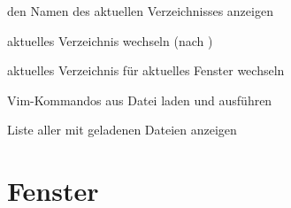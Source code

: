 \documentclass
[
  draft    = true,
  fontsize = 11pt,
  parskip  = half,
  BCOR     = 0pt,
  DIV      = calc,
  ngerman
]
{scrartcl}
\begin{document}
\begin{mytemize}
  \item {}     den Namen des aktuellen Verzeichnisses anzeigen
  \item {}     aktuelles Verzeichnis wechseln (nach )
  \item {}    aktuelles Verzeichnis für aktuelles Fenster wechseln
  \item {} Vim-Kommandos aus Datei  laden und ausführen
  \item {}   Liste aller mit  geladenen Dateien anzeigen
\end{mytemize}

\section{Fenster}
\end{document}
